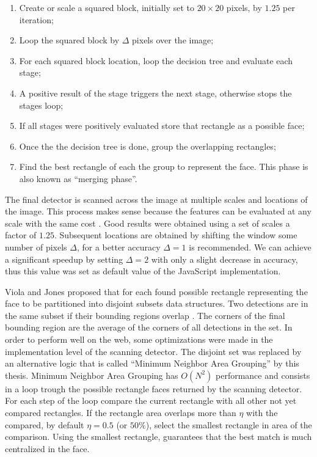 \begin{enumerate}
  \item Create or scale a squared block, initially set to $20\times20$ pixels, by $1.25$ per iteration;
  \item Loop the squared block by $\Delta$ pixels over the image;
  \item For each squared block location, loop the decision tree and evaluate each stage;
  \item A positive result of the stage \cite{Viola2001} triggers the next stage, otherwise stops the stages loop;
  \item If all stages were positively evaluated store that rectangle as a possible face;
  \item Once the the decision tree is done, group the overlapping rectangles;
  \item Find the best rectangle of each the group to represent the face. This phase is also known as ``merging phase''.
\end{enumerate}

The final detector is scanned across the image at multiple scales and locations of the image. This process makes sense because the features can be evaluated at any scale with the same cost \cite{Viola2001}. Good results were obtained using a set of scales a factor of $1.25$. Subsequent locations are obtained by shifting the window some number of pixels $\Delta$, for a better accuracy $\Delta=1$ is recommended. We can achieve a significant speedup by setting $\Delta=2$ with only a slight decrease in accuracy, thus this value was set as default value of the JavaScript \cite{International2009} implementation.

Viola and Jones \cite{Viola2001} proposed that for each found possible rectangle representing the face to be partitioned into disjoint subsets data structures. Two detections are in the same subset if their bounding regions overlap \cite{Viola2001}. The corners of the final bounding region are the average of the corners of all detections in the set. In order to perform well on the web, some optimizations were made in the implementation level of the scanning detector. The disjoint set was replaced by an alternative logic that is called ``Minimum Neighbor Area Grouping'' by this thesis. Minimum Neighbor Area Grouping has $O(N^2)$ performance \cite{black2007big} and consists in a loop trough the possible rectangle faces returned by the scanning detector. For each step of the loop compare the current rectangle with all other not yet compared rectangles. If the rectangle area overlaps more than $\eta$ with the compared, by default $\eta=0.5$ (or $50\%$), select the smallest rectangle in area of the comparison. Using the smallest rectangle, guarantees that the best match is much centralized in the face.

